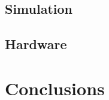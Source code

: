\documentclass[letterpaper, 10 pt, conference]{ieeeconf}  %
\begin{document}
\subsection{Simulation}

\subsection{Hardware}
\section{Conclusions}\label{conclusions}




\end{document}
